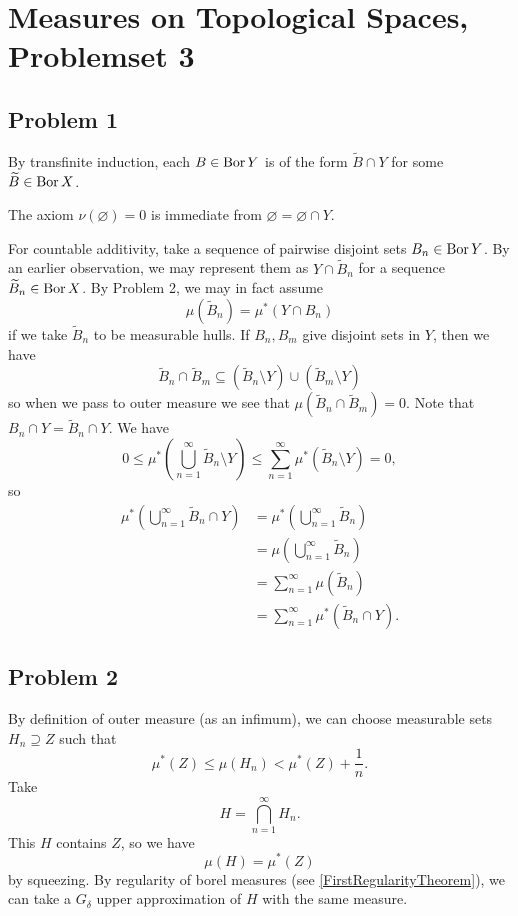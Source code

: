 \chapter{Measures on Topological Spaces, Problemset 3}

\section*{Problem 1}

By transfinite induction, each \( B \in \operatorname{Bor} Y \) is of the form \( \widetilde{B} \cap Y \) for some \( \widetilde{B} \in \operatorname{Bor} X \). 

The axiom \( \nu( \varnothing ) = 0 \) is immediate from \( \varnothing = \varnothing \cap Y \).

For countable additivity, take a sequence of pairwise disjoint sets \( B_n \in \operatorname{Bor} Y \). By an earlier observation, we may represent them as \( Y \cap \widetilde{B}_n \) for a sequence \( \widetilde{B}_n \in \operatorname{Bor} X \). By Problem 2, we may in fact assume
\[ 
    \mu(\widetilde{B}_n) = \mu^*(Y \cap B_n)
\]
if we take \( \widetilde{B}_n \) to be measurable hulls. If \( B_n, B_m \) give disjoint sets in \( Y \), then we have
\[ 
    \widetilde{B}_n \cap \widetilde{B}_m \subseteq (\widetilde{B}_n \setminus Y) \cup (\widetilde{B}_m \setminus Y)
\]
so when we pass to outer measure we see that \( \mu(\widetilde{B}_n \cap \widetilde{B}_m) = 0. \) Note that \( B_n \cap Y = \widetilde{B}_n \cap Y \). We have
\[ 
    0 \leqslant \mu^* \left( \bigcup_{n=1}^\infty \widetilde{B}_{n} \setminus Y\right) \leqslant \sum_{n=1}^\infty \mu^*(\widetilde{B}_n \setminus Y) = 0,
\]
so
\begin{align*}
    \mu^* \left( \bigcup_{n=1}^\infty \widetilde{B}_n \cap Y \right) &= \mu^* \left( \bigcup_{n=1}^\infty \widetilde{B}_n \right) \\
&= \mu \left( \bigcup_{n=1}^\infty \widetilde{B}_n \right) \\
&= \sum_{n=1}^\infty \mu \left( \widetilde{B}_n \right) \\
&= \sum_{n=1}^\infty \mu^* \left( \widetilde{B}_n \cap Y \right).
\end{align*}
\section*{Problem 2}

By definition of outer measure (as an infimum), we can choose measurable sets \( H_n \supseteq Z \) such that
\[ 
    \mu^*(Z) \leqslant \mu(H_n) < \mu^*(Z) + \frac{1}{n}. 
\]
Take
\[ 
    H = \bigcap_{n=1}^\infty H_n. 
\]
This \( H \) contains \( Z \), so we have
\[ 
    \mu(H) = \mu^*(Z) 
\]
by squeezing. By regularity of borel measures (see \ref{FirstRegularityTheorem}), we can take a \( G_\delta \) upper approximation of \( H \) with the same measure.

